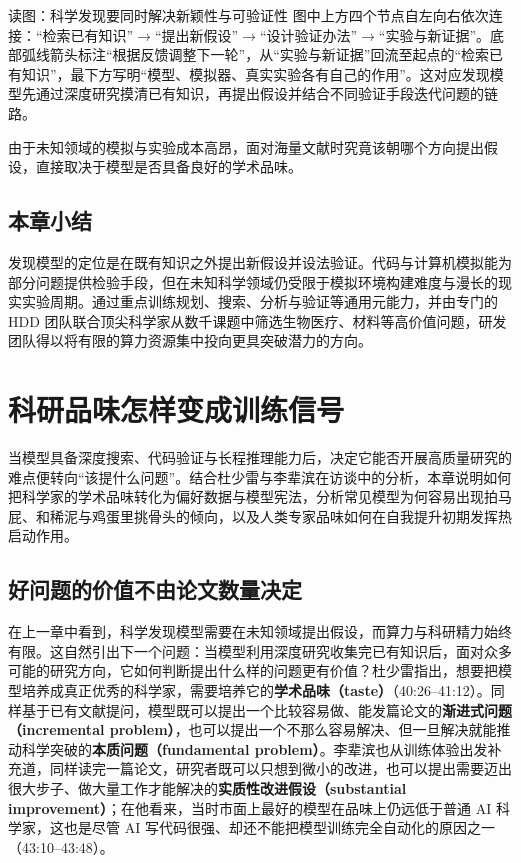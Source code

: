 \documentclass[UTF8,a4paper,11pt,fontset=fandol]{ctexart}
\begin{document}
\begin{knowledgebox}{读图：科学发现要同时解决新颖性与可验证性}
图中上方四个节点自左向右依次连接：“检索已有知识”\ensuremath{\rightarrow}“提出新假设”\ensuremath{\rightarrow}“设计验证办法”\ensuremath{\rightarrow}“实验与新证据”。底部弧线箭头标注“根据反馈调整下一轮”，从“实验与新证据”回流至起点的“检索已有知识”，最下方写明“模型、模拟器、真实实验各有自己的作用”。这对应发现模型先通过深度研究摸清已有知识，再提出假设并结合不同验证手段迭代问题的链路。
\end{knowledgebox}
由于未知领域的模拟与实验成本高昂，面对海量文献时究竟该朝哪个方向提出假设，直接取决于模型是否具备良好的学术品味。
\subsection{本章小结}
发现模型的定位是在既有知识之外提出新假设并设法验证。代码与计算机模拟能为部分问题提供检验手段，但在未知科学领域仍受限于模拟环境构建难度与漫长的现实实验周期。通过重点训练规划、搜索、分析与验证等通用元能力，并由专门的 HDD 团队联合顶尖科学家从数千课题中筛选生物医疗、材料等高价值问题，研发团队得以将有限的算力资源集中投向更具突破潜力的方向。
\section{科研品味怎样变成训练信号}
当模型具备深度搜索、代码验证与长程推理能力后，决定它能否开展高质量研究的难点便转向“该提什么问题”。结合杜少雷与李辈滨在访谈中的分析，本章说明如何把科学家的学术品味转化为偏好数据与模型宪法，分析常见模型为何容易出现拍马屁、和稀泥与鸡蛋里挑骨头的倾向，以及人类专家品味如何在自我提升初期发挥热启动作用。
\subsection{好问题的价值不由论文数量决定}
在上一章中看到，科学发现模型需要在未知领域提出假设，而算力与科研精力始终有限。这自然引出下一个问题：当模型利用深度研究收集完已有知识后，面对众多可能的研究方向，它如何判断提出什么样的问题更有价值？杜少雷指出，想要把模型培养成真正优秀的科学家，需要培养它的\textbf{学术品味（taste）}（40:26–41:12）。同样基于已有文献提问，模型既可以提出一个比较容易做、能发篇论文的\textbf{渐进式问题（incremental problem）}，也可以提出一个不那么容易解决、但一旦解决就能推动科学突破的\textbf{本质问题（fundamental problem）}。李辈滨也从训练体验出发补充道，同样读完一篇论文，研究者既可以只想到微小的改进，也可以提出需要迈出很大步子、做大量工作才能解决的\textbf{实质性改进假设（substantial improvement）}；在他看来，当时市面上最好的模型在品味上仍远低于普通 AI 科学家，这也是尽管 AI 写代码很强、却还不能把模型训练完全自动化的原因之一（43:10–43:48）。
\end{document}
